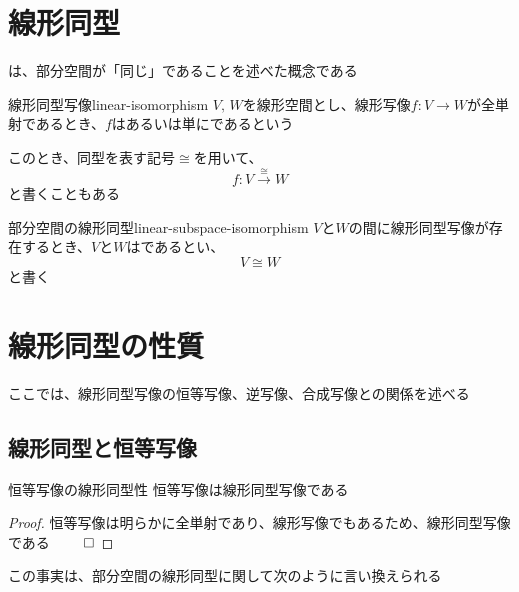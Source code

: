 \documentclass[../../../topic_linear-algebra]{subfiles}
\begin{document}
\sectionline
\section{線形同型}

は、部分空間が「同じ」であることを述べた概念である

\begin{definition}{線形同型写像}{linear-isomorphism}
  $V,\,W$を線形空間とし、線形写像$f\colon V \to W$が全単射であるとき、$f$はあるいは単にであるという

  このとき、同型を表す記号$\cong$を用いて、
  \begin{equation*}
    f\colon V \xrightarrow{\cong} W
  \end{equation*}
  と書くこともある
\end{definition}

\begin{definition}{部分空間の線形同型}{linear-subspace-isomorphism}
  $V$と$W$の間に線形同型写像が存在するとき、$V$と$W$はであるとい、
  \begin{equation*}
    V \cong W
  \end{equation*}
  と書く
\end{definition}

\sectionline
\section{線形同型の性質}

ここでは、線形同型写像の恒等写像、逆写像、合成写像との関係を述べる

\subsection{線形同型と恒等写像}

\begin{theorem*}{恒等写像の線形同型性}
  恒等写像は線形同型写像である
\end{theorem*}

\begin{proof}
  恒等写像は明らかに全単射であり、線形写像でもあるため、線形同型写像である $\qed$
\end{proof}

この事実は、部分空間の線形同型に関して次のように言い換えられる
\end{document}
